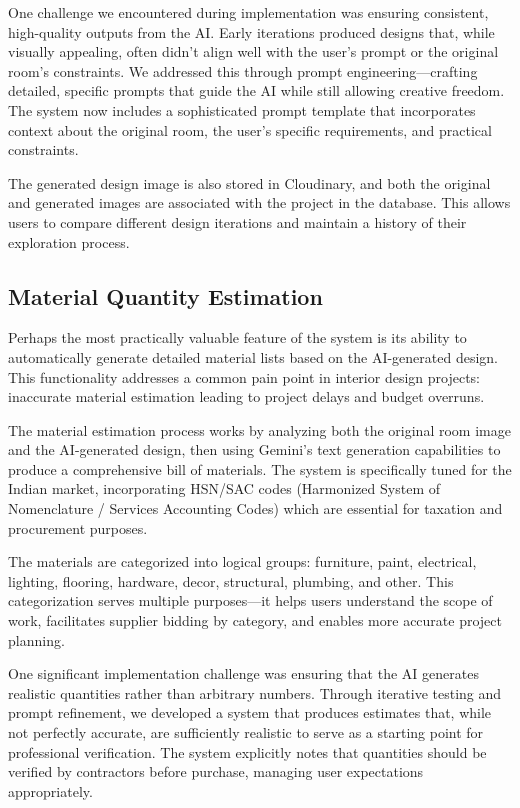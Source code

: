 \documentclass[conference]{IEEEtran}
\begin{document}
One challenge we encountered during implementation was ensuring consistent, high-quality outputs from the AI. Early iterations produced designs that, while visually appealing, often didn't align well with the user's prompt or the original room's constraints. We addressed this through prompt engineering—crafting detailed, specific prompts that guide the AI while still allowing creative freedom. The system now includes a sophisticated prompt template that incorporates context about the original room, the user's specific requirements, and practical constraints.

The generated design image is also stored in Cloudinary, and both the original and generated images are associated with the project in the database. This allows users to compare different design iterations and maintain a history of their exploration process.

\subsection{Material Quantity Estimation}
Perhaps the most practically valuable feature of the system is its ability to automatically generate detailed material lists based on the AI-generated design. This functionality addresses a common pain point in interior design projects: inaccurate material estimation leading to project delays and budget overruns.

The material estimation process works by analyzing both the original room image and the AI-generated design, then using Gemini's text generation capabilities to produce a comprehensive bill of materials. The system is specifically tuned for the Indian market, incorporating HSN/SAC codes (Harmonized System of Nomenclature / Services Accounting Codes) which are essential for taxation and procurement purposes.

The materials are categorized into logical groups: furniture, paint, electrical, lighting, flooring, hardware, decor, structural, plumbing, and other. This categorization serves multiple purposes—it helps users understand the scope of work, facilitates supplier bidding by category, and enables more accurate project planning.

One significant implementation challenge was ensuring that the AI generates realistic quantities rather than arbitrary numbers. Through iterative testing and prompt refinement, we developed a system that produces estimates that, while not perfectly accurate, are sufficiently realistic to serve as a starting point for professional verification. The system explicitly notes that quantities should be verified by contractors before purchase, managing user expectations appropriately.
\end{document}
